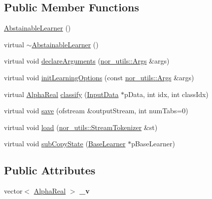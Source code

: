 \subsection*{Public Member Functions}
\begin{DoxyCompactItemize}
\item 
\hyperlink{classMultiBoost_1_1AbstainableLearner_a06fc9ee8990754c94c1d9d312f9e780c}{Abstainable\-Learner} ()
\item 
virtual \hyperlink{classMultiBoost_1_1AbstainableLearner_a098fcf8c83ad5b80cf01d5973988758c}{$\sim$\-Abstainable\-Learner} ()
\item 
virtual void \hyperlink{classMultiBoost_1_1AbstainableLearner_add9773c8057fea7885edb8c1a07cfbd8}{declare\-Arguments} (\hyperlink{classnor__utils_1_1Args}{nor\-\_\-utils\-::\-Args} \&args)
\item 
virtual void \hyperlink{classMultiBoost_1_1AbstainableLearner_a966b1609a95222953e4116a3fffaadbe}{init\-Learning\-Options} (const \hyperlink{classnor__utils_1_1Args}{nor\-\_\-utils\-::\-Args} \&args)
\item 
virtual \hyperlink{Defaults_8h_a80184c4fd10ab70a1a17c5f97dcd1563}{Alpha\-Real} \hyperlink{classMultiBoost_1_1AbstainableLearner_aedcb9bae3cce79f1f8cfc2570698aa97}{classify} (\hyperlink{classMultiBoost_1_1InputData}{Input\-Data} $\ast$p\-Data, int idx, int class\-Idx)
\item 
virtual void \hyperlink{classMultiBoost_1_1AbstainableLearner_adb503537cf9edf4c4469b43d3db47073}{save} (ofstream \&output\-Stream, int num\-Tabs=0)
\item 
virtual void \hyperlink{classMultiBoost_1_1AbstainableLearner_a571f0ef9449cd3a7bc56f8a0131db6f1}{load} (\hyperlink{classnor__utils_1_1StreamTokenizer}{nor\-\_\-utils\-::\-Stream\-Tokenizer} \&st)
\item 
virtual void \hyperlink{classMultiBoost_1_1AbstainableLearner_a36ad3b89e190941788eee53595b288b0}{sub\-Copy\-State} (\hyperlink{classMultiBoost_1_1BaseLearner}{Base\-Learner} $\ast$p\-Base\-Learner)
\end{DoxyCompactItemize}
\subsection*{Public Attributes}
\begin{DoxyCompactItemize}
\item 
\hypertarget{classMultiBoost_1_1AbstainableLearner_af9deda1ca0bf2145dce5d86e15b7487b}{vector$<$ \hyperlink{Defaults_8h_a80184c4fd10ab70a1a17c5f97dcd1563}{Alpha\-Real} $>$ {\bfseries \-\_\-v}}\label{classMultiBoost_1_1AbstainableLearner_af9deda1ca0bf2145dce5d86e15b7487b}

\end{DoxyCompactItemize}
